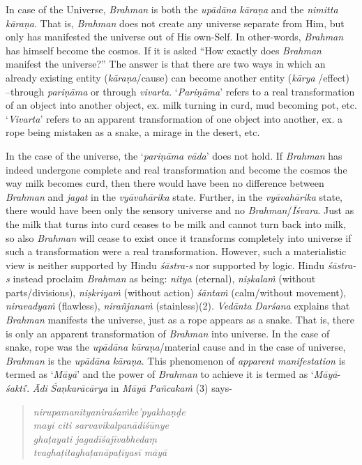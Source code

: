 In case of the Universe, \emph{Brahman} is both the \emph{upādāna} \emph{kāraṇa} and the \emph{nimitta} \emph{kāraṇa}. That is, \emph{Brahman} does not create any universe separate from Him, but only has manifested the universe out of His own-Self. In other-words, \emph{Brahman} has himself become the cosmos. If it is asked ``How exactly does \emph{Brahman} manifest the universe?'' The answer is that there are two ways in which an already existing entity (\emph{kāraṇa}/cause) can become another entity (\emph{kārya} /effect) --through \emph{pariṇāma} or through \emph{vivarta}. `\emph{Pariṇāma}' refers to a real transformation of an object into another object, ex. milk turning in curd, mud becoming pot, etc. `\emph{Vivarta}' refers to an apparent transformation of one object into another, ex. a rope being mistaken as a snake, a mirage in the desert, etc.

In the case of the universe, the `\emph{pariṇāma} \emph{vāda}' does not hold. If \emph{Brahman} has indeed undergone complete and real transformation and become the cosmos the way milk becomes curd, then there would have been no difference between \emph{Brahman} and \emph{jagat} in the \emph{vyāvahārika} state. Further, in the \emph{vyāvahārika} state, there would have been only the sensory universe and no \emph{Brahman}/\emph{Īśvara}. Just as the milk that turns into curd ceases to be milk and cannot turn back into milk, so also \emph{Brahman} will cease to exist once it transforms completely into universe if such a transformation were a real transformation. However, such a materialistic view is neither supported by Hindu \emph{śāstra-s} nor supported by logic. Hindu \emph{śāstra-s} instead proclaim \emph{Brahman} as being: \emph{nitya} (eternal), \emph{niṣkalaṁ} (without parts/divisions), \emph{niṣkriyaṁ} (without action) \emph{śāntaṁ} (calm/without movement), \emph{niravadyaṁ} (flawless), \emph{nirañjanaṁ} (stainless)(2). \emph{Vedānta} \emph{Darśana} explains that \emph{Brahman} manifests the universe, just as a rope appears as a snake. That is, there is only an apparent transformation of \emph{Brahman} into universe. In the case of snake, rope was the \emph{upādāna} \emph{kāraṇa}/material cause and in the case of universe, \emph{Brahman} is the \emph{upādāna} \emph{kāraṇa}. This phenomenon of \emph{apparent manifestation} is termed as `\emph{Māyā}' and the power of \emph{Brahman} to achieve it is termed as `\emph{Māyā}-\emph{śakti}'. \emph{Ādi} \emph{Śaṇkarācārya} in \emph{Māyā} \emph{Pañcakaṁ} (3) says-
\vskip -10pt

\begin{verse}
\emph{nirupamanityaniraśaṁke'pyakhaṇḍe}\\
\emph{mayi citi sarvavikalpanādiśūnye }\\
\emph{ghaṭayati jagadīśajīvabhedaṃ}\\
\emph{tvaghaṭitaghaṭanāpaṭīyasī māyā }
\end{verse}
\vskip -10pt

